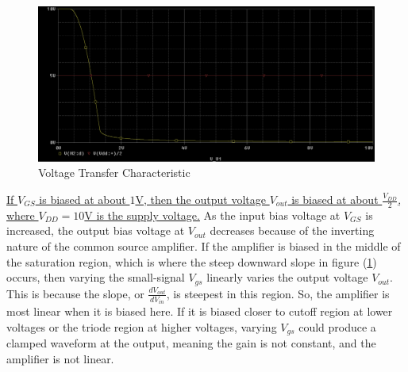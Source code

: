\FloatBarrier

\begin{figure}[h!]
	\centering
	\includegraphics[scale=0.50]{./images/vout_vs_v3.PNG}
	\caption{Voltage Transfer Characteristic}
	\label{fig:vout_vs_v3}
\end{figure}

\FloatBarrier

\uline{If $V_{GS}$ is biased at about $1$\si{\volt}, then the output voltage $V_{out}$ is biased at about $\frac{V_{DD}}{2}$, where $V_{DD} = 10$\si{\volt} is the supply voltage.} As the input bias voltage at $V_{GS}$ is increased, the output bias voltage at $V_{out}$ decreases because of the inverting nature of the common source amplifier. If the amplifier is biased in the middle of the saturation region, which is where the steep downward slope in figure (\ref{fig:vout_vs_v3}) occurs, then varying the small-signal $V_{gs}$ linearly varies the output voltage $V_{out}$. This is because the slope, or $\frac{dV_{out}}{dV_{in}}$, is steepest in this region. So, the amplifier is most linear when it is biased here. If it is biased closer to cutoff region at lower voltages or the triode region at higher voltages, varying $V_{gs}$ could produce a clamped waveform at the output, meaning the gain is not constant, and the amplifier is not linear. \\
